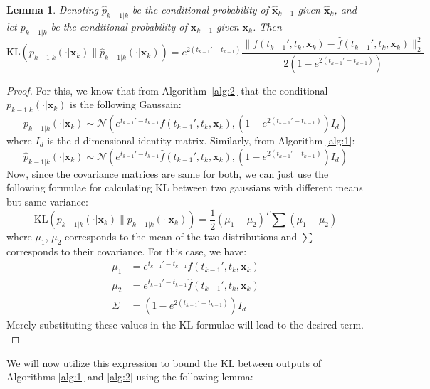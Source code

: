 \documentclass[11pt]{article}
\def\rvx{{\mathbf{x}}}
\newcommand{\KL}[2]{\mathrm{KL}\left(#1 \big\| #2\right)}
\newtheorem{lemma}{Lemma}[section]
\begin{document}
\begin{lemma}
\label{lemma_first_kl_bw_conditionals}
 Denoting $\hat{p}_{k-1|k}$ be the conditional probability of
  $\hat{\rvx}_{k-1}$  given $\hat{\rvx}_k$, and let
  ${p}_{k-1|k}$ be the conditional probability of
  $\rvx_{k-1}$ given $\rvx_k$. Then
  \[
    \KL{{p}_{k-1|k}(\cdot|{\rvx}_{k})}{\hat{p}_{k-1|k}(\cdot|{\rvx}_k)}
    =  e^{2(t_{k-1}'-t_{k-1})}
    \frac{\|
      f(t_{k-1}',t_k,{\rvx}_k)-\hat{f}(t_{k-1}',t_k, {\rvx}_k)\|_2^2}
    {2 (1  -e^{2(t_{k-1}'-t_{k-1})})}     
  \]
\end{lemma}
\begin{proof}
For this, we know that from Algorithm~\ref{alg:2} that the conditional ${p}_{k-1|k}(\cdot|{\rvx}_{k})$ is the following Gaussain: \[
{p}_{k-1|k}(\cdot|{\rvx}_{k}) \sim \mathcal{N}\left(e^{t_{k-1}' - t_{k-1}} f(t_{k-1}', t_k, \rvx_k), \left(1 - e^{2(t_{k-1}' - t_{k-1})}\right) I_d \right)
\]
where $I_d$ is the d-dimensional identity matrix. Similarly, from Algorithm \ref{alg:1}:
\[
\hat{p}_{k-1|k}(\cdot|{\rvx}_{k}) \sim \mathcal{N}\left(e^{t_{k-1}' - t_{k-1}} \hat{f}(t_{k-1}', t_k, \rvx_k), \left(1 - e^{2(t_{k-1}' - t_{k-1})}\right) I_d \right)
\]
Now, since the covariance matrices are same for both, we can just use the following formulae for calculating KL between two gaussians with different means but same variance:
\[
\KL{{p}_{k-1|k}(\cdot|{\rvx}_{k})}{{p}_{k-1|k}(\cdot|{\rvx}_k)} = \frac{1}{2}(\mu_1-\mu_2)^T\sum(\mu_1-\mu_2)  
\]
where $\mu_1$, $\mu_2$ corresponds to the mean of the two distributions and $\sum$ corresponds to their covariance. For this case, we have:
\begin{align*}
\mu_1 &= e^{t_{k-1}' - t_{k-1}} f(t_{k-1}', t_k, \rvx_k) \\
\mu_2 &= e^{t_{k-1}' - t_{k-1}} \hat{f}(t_{k-1}', t_k, \rvx_k) \\
\Sigma &= \left(1 - e^{2(t_{k-1}' - t_{k-1})} \right) I_d
\end{align*}
Merely substituting these values in the KL formulae will lead to the desired term. \\
\end{proof}


\noindent
We will now utilize this expression to bound the KL between outputs of Algorithms \ref{alg:1} and \ref{alg:2} using the following lemma:
\end{document}

